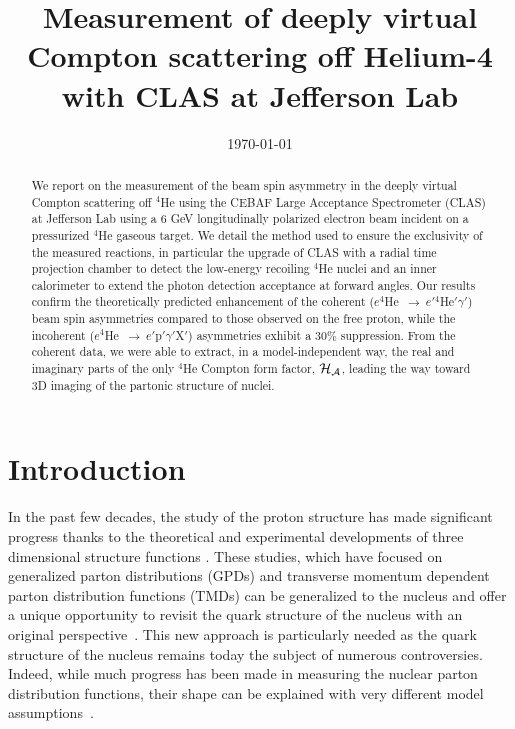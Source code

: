 \documentclass[aps,prc,preprint,superscriptaddress]{revtex4}
\begin{document}
\title{Measurement of deeply virtual Compton scattering off Helium-4 with CLAS at Jefferson Lab}



\date{\today}

\begin{abstract}
We report on the measurement of the beam spin asymmetry in the deeply virtual Compton 
scattering off $^4$He using the CEBAF Large Acceptance Spectrometer (CLAS) at
Jefferson Lab using a 6 GeV longitudinally polarized electron beam incident on a 
pressurized $^4$He gaseous target. We detail the method used to ensure the exclusivity 
of the measured reactions, in particular the upgrade of CLAS with a radial time 
projection chamber to detect the 
low-energy recoiling $^4$He nuclei and an inner calorimeter to extend the 
photon detection acceptance at forward angles. Our results confirm the 
theoretically predicted enhancement of the coherent 
($e^4$He~$\to~e'$$^4$He$'\gamma'$) beam spin asymmetries compared to those 
observed on the free proton, while the incoherent 
($e^4$He~$\to~e'$p$'\gamma'$X$'$) asymmetries exhibit a 30$\%$ suppression.  
From the coherent data, we were able to extract, in a model-independent way, 
the real and imaginary parts of the only $^4$He Compton form factor, $\cal 
H_A$, leading the way toward 3D imaging of the partonic structure of nuclei.
\end{abstract}


\maketitle

\section{Introduction}

In the past few decades, the study of the proton structure has made significant progress
thanks to the theoretical and experimental developments of three dimensional 
structure functions \cite{Anselmino:2015uka}. These studies, which have focused on generalized
parton distributions (GPDs) and transverse momentum dependent parton distribution functions (TMDs)
can be generalized to the nucleus and offer a unique opportunity to revisit the quark structure 
of the nucleus with an original perspective~\cite{Dupre:2015jha}. This new approach is 
particularly needed as the quark structure of the nucleus remains today the subject of numerous
controversies. Indeed, while much progress has been made in measuring the nuclear
parton distribution functions, their shape can be explained with very different model 
assumptions~\cite{Norton:2003cb,Malace:2014uea,Hen:2016kwk}.
\end{document}
